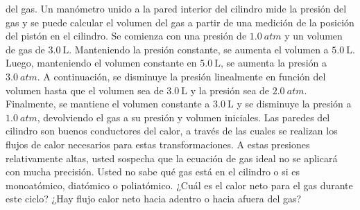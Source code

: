 \begin{Exercise}
{del gas. Un manómetro unido a la pared interior del cilindro mide la presión del gas y se puede calcular el volumen del gas a partir de una medición de la posición del pistón en el cilindro. Se comienza con una presión de $\SI{1.0}{atm}$ y un volumen de gas de $\SI{3.0}{\liter}$. Manteniendo la  presión constante, se aumenta el volumen a $\SI{5.0}{\liter}$. Luego, manteniendo el volumen constante en $\SI{5.0}{\liter}$, se aumenta la presión a $\SI{3.0}{atm}$. A continuación, se disminuye la presión linealmente en función del volumen hasta que el volumen sea de $\SI{3.0}{\liter}$ y la presión sea de $\SI{2.0}{atm}$. Finalmente, se mantiene el volumen constante a $\SI{3.0}{\liter}$ y se disminuye la presión a $\SI{1.0}{atm}$, devolviendo el gas a su presión y volumen iniciales. Las paredes del cilindro son buenos conductores del calor, a través de las cuales se realizan los flujos de calor necesarios para estas transformaciones. A estas presiones relativamente altas, usted sospecha que la ecuación de gas ideal no se aplicará con mucha precisión. Usted no sabe qué gas está en el cilindro o si es monoatómico, diatómico o poliatómico. ¿Cuál es el calor neto para el gas durante este ciclo? ¿Hay flujo calor neto hacia adentro o hacia afuera del gas?
\\ 
}
%
%
%
\end{Exercise}
